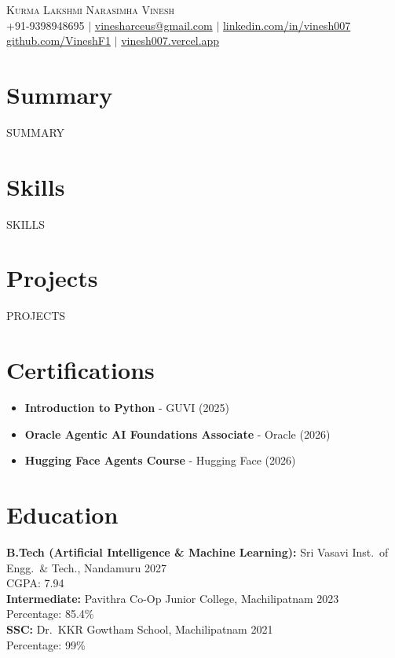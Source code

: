 \documentclass[letterpaper,11pt]{article}
\begin{document}
\begin{center}
{\fontsize{24}{26}\selectfont\scshape Kurma Lakshmi Narasimha Vinesh}\\[3pt]
+91-9398948695 \hspace{0.8em} $|$ \hspace{0.8em}
\href{mailto:vinesharceus@gmail.com}{vinesharceus@gmail.com} \hspace{0.8em} $|$ \hspace{0.8em}
\href{https://linkedin.com/in/vinesh007}{linkedin.com/in/vinesh007}\\[2pt]
\href{https://github.com/VineshF1}{github.com/VineshF1} \hspace{0.8em} $|$ \hspace{0.8em}
\href{https://vinesh007.vercel.app}{vinesh007.vercel.app}
\end{center}

\section*{Summary}
{{SUMMARY}}
\section*{Skills}
{{SKILLS}}

\section*{Projects}

{{PROJECTS}}

\section*{Certifications}
\begin{itemize}
\item \textbf{Introduction to Python} - GUVI (2025)
\item \textbf{Oracle Agentic AI Foundations Associate} - Oracle (2026)
\item \textbf{Hugging Face Agents Course} - Hugging Face (2026)
\end{itemize}

\section*{Education}
{\bfseries B.Tech (Artificial Intelligence \& Machine Learning):} Sri Vasavi Inst.\ of Engg.\ \& Tech., Nandamuru
\hfill {2027}\\
CGPA: 7.94\\[1pt]
{\bfseries Intermediate:} Pavithra Co-Op Junior College, Machilipatnam
\hfill {2023}\\
Percentage: 85.4\%\\[1pt]
{\bfseries SSC:} Dr.\ KKR Gowtham School, Machilipatnam
\hfill {2021}\\
Percentage: 99\%
\end{document}
